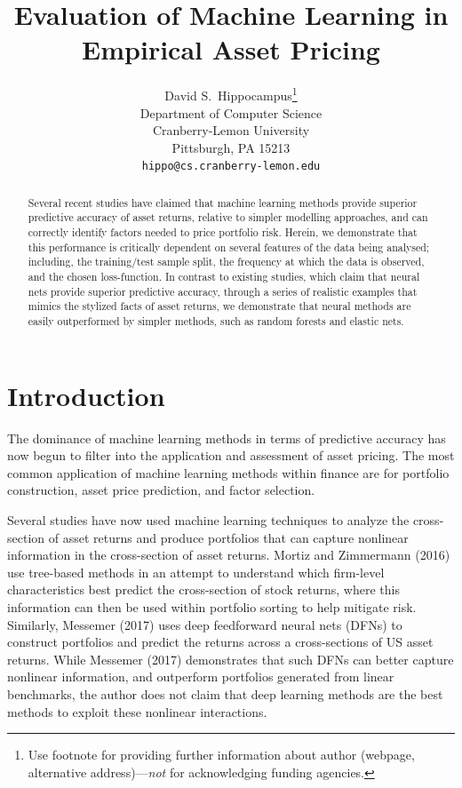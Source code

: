 \documentclass{article}
\title{Evaluation of Machine Learning in Empirical Asset Pricing}
\author{%
  David S.~Hippocampus\thanks{Use footnote for providing further information
    about author (webpage, alternative address)---\emph{not} for acknowledging
    funding agencies.} \\
  Department of Computer Science\\
  Cranberry-Lemon University\\
  Pittsburgh, PA 15213 \\
  \texttt{hippo@cs.cranberry-lemon.edu} \\
}
\begin{document}
\maketitle

\begin{abstract}
	Several recent studies have claimed that machine learning methods provide superior predictive accuracy of asset returns, relative to simpler modelling approaches, and can correctly identify factors needed to price portfolio risk. Herein, we demonstrate that this performance is critically dependent on several features of the data being analysed; including, the training/test sample split, the frequency at which the data is observed, and the chosen loss-function. In contrast to existing studies, which claim that neural nets provide superior predictive accuracy, through a series of realistic examples that mimics the stylized facts of asset returns, we demonstrate that neural methods are easily outperformed by simpler methods, such as random forests and elastic nets.
\end{abstract}

\section{Introduction}
The dominance of machine learning methods in terms of predictive accuracy has now begun to filter into the application and assessment of asset pricing. The most common application of machine learning methods within finance are for portfolio construction, asset price prediction, and factor selection. 

Several studies have now used machine learning techniques to analyze the cross-section of asset returns and produce portfolios that can capture nonlinear information in the cross-section of asset returns. Mortiz and Zimmermann (2016) use tree-based methods in an attempt to understand which firm-level characteristics best predict the cross-section of stock returns, where this information can then be used within portfolio sorting to help mitigate risk. Similarly, Messemer (2017) uses deep feedforward neural nets (DFNs) to construct portfolios and predict the returns across a cross-sections of US asset returns. While Messemer (2017) demonstrates that such DFNs can better capture nonlinear information, and outperform portfolios generated from linear benchmarks, the author does not claim that deep learning methods are the best methods to exploit these nonlinear interactions. 
\end{document}
